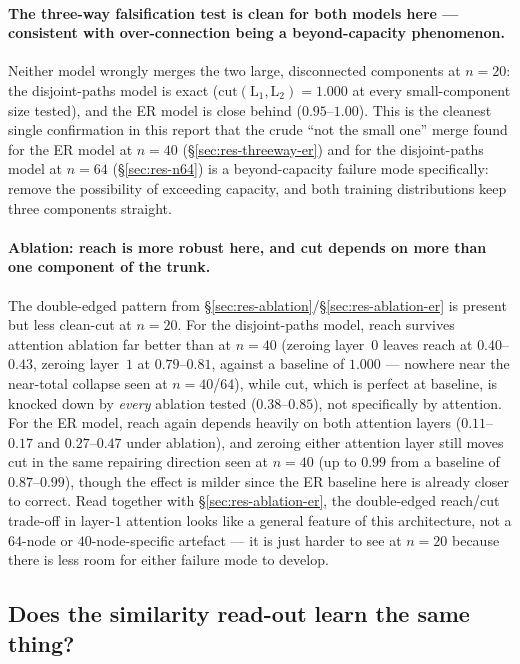 \documentclass[11pt,a4paper]{article}
\begin{document}
\paragraph{The three-way falsification test is clean for both models here --- consistent with
over-connection being a beyond-capacity phenomenon.} Neither model wrongly merges the two
large, disconnected components at $n=20$: the disjoint-paths model is exact
($\mathrm{cut}(\mathrm{L}_1,\mathrm{L}_2)=1.000$ at every small-component size tested), and the
ER model is close behind ($0.95$--$1.00$). This is the cleanest single confirmation in this
report that the crude ``not the small one'' merge found for the ER model at $n=40$
(\S\ref{sec:res-threeway-er}) and for the disjoint-paths model at $n=64$
(\S\ref{sec:res-n64}) is a beyond-capacity failure mode specifically: remove the possibility
of exceeding capacity, and both training distributions keep three components straight.

\paragraph{Ablation: reach is more robust here, and cut depends on more than one component of
the trunk.} The double-edged pattern from \S\ref{sec:res-ablation}/\S\ref{sec:res-ablation-er}
is present but less clean-cut at $n=20$. For the disjoint-paths model, reach survives
attention ablation far better than at $n=40$ (zeroing layer~$0$ leaves reach at
$0.40$--$0.43$, zeroing layer~$1$ at $0.79$--$0.81$, against a baseline of $1.000$ ---
nowhere near the near-total collapse seen at $n=40$/$64$), while cut, which is perfect at
baseline, is knocked down by \emph{every} ablation tested ($0.38$--$0.85$), not specifically
by attention. For the ER model, reach again depends heavily on both attention layers
($0.11$--$0.17$ and $0.27$--$0.47$ under ablation), and zeroing either attention layer still
moves cut in the same repairing direction seen at $n=40$ (up to $0.99$ from a baseline of
$0.87$--$0.99$), though the effect is milder since the ER baseline here is already closer to
correct. Read together with \S\ref{sec:res-ablation-er}, the double-edged reach/cut trade-off
in layer-$1$ attention looks like a general feature of this architecture, not a $64$-node or
$40$-node-specific artefact --- it is just harder to see at $n=20$ because there is less room
for either failure mode to develop.

\subsection{Does the similarity read-out learn the same thing?}
\label{sec:res-similarity}
\end{document}

